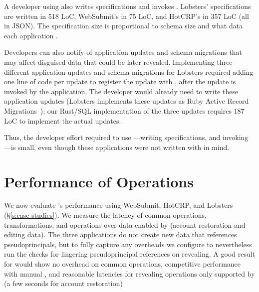 %
A developer using \sys also writes \xx specifications and invokes \sys.
Lobsters' \xx specifications are written in 518 LoC, WebSubmit's in 75 LoC, and
HotCRP's in 357 LoC (all in JSON).  The specification size is proportional to
schema size and what data each application \xxs.

Developers can also notify \sys of application updates and schema migrations
that may affect disguised data that could be later revealed.  Implementing three
different application updates and schema migrations for Lobsters required adding
one line of code per update to register the update with \sys, after the update
is invoked by the application. The developer would
already need to write these application updates (\eg Lobsters implements these
updates as Ruby Active Record Migrations~\cite{ruby_arm}); our Rust/SQL
implementation of the three updates requires 187 LoC to implement the actual
updates.

%
Thus, the developer effort required to use \sys---writing \sys specifications, and
invoking \sys---is small, even though these applications were not written with
\sys in mind.

\section{Performance of \sys Operations}
\label{s:eval-ops}

%
We now evaluate \sys's performance using WebSubmit,
HotCRP, and Lobsters (\S\ref{s:case-studies}).
%
%
We measure the latency of common operations, \xxing transformations,
and operations over \xxed data enabled by \sys
(\eg account restoration and editing \xxed data).
%
The three applications do not create new data that references pseudoprincipals,
but to fully capture any overheads we configure \sys to nevertheless run the
checks for lingering pseudoprincipal references on revealing.
%
A good result for \sys would show no overhead on common operations,
competitive performance with manual \xxing, and reasonable
latencies for revealing operations only supported by \sys
(\eg a few seconds for account restoration)
%

